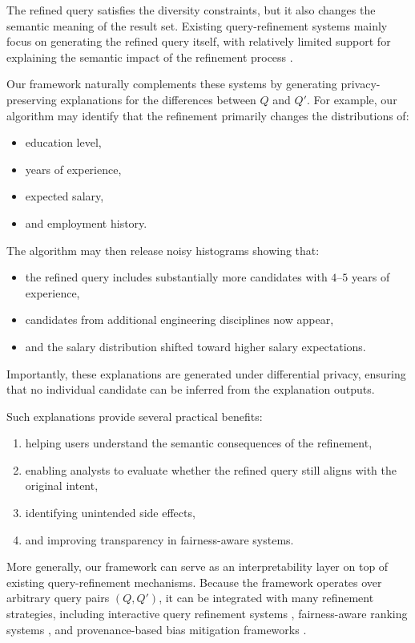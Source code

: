 The refined query satisfies the diversity constraints,
but it also changes the semantic meaning of the result set.
Existing query-refinement systems mainly focus on generating the refined query itself,
with relatively limited support for explaining the semantic impact
of the refinement process \cite{MK09,ERICA}.

Our framework naturally complements these systems by generating
privacy-preserving explanations for the differences between $Q$
and $Q'$.
For example, our algorithm may identify that the refinement
primarily changes the distributions of:
\begin{itemize}
    \item education level,
    \item years of experience,
    \item expected salary,
    \item and employment history.
\end{itemize}

The algorithm may then release noisy histograms showing that:
\begin{itemize}
    \item the refined query includes substantially more candidates
    with $4$--$5$ years of experience,
    \item candidates from additional engineering disciplines now appear,
    \item and the salary distribution shifted toward higher salary expectations.
\end{itemize}

Importantly, these explanations are generated under differential privacy,
ensuring that no individual candidate can be inferred from the explanation outputs.

Such explanations provide several practical benefits:
\begin{enumerate}
    \item helping users understand the semantic consequences of the refinement,
    \item enabling analysts to evaluate whether the refined query still aligns
    with the original intent,
    \item identifying unintended side effects,
    \item and improving transparency in fairness-aware systems.
\end{enumerate}

More generally, our framework can serve as an interpretability layer
on top of existing query-refinement mechanisms.
Because the framework operates over arbitrary query pairs $(Q,Q')$,
it can be integrated with many refinement strategies,
including interactive query refinement systems \cite{MK09},
fairness-aware ranking systems \cite{SYJ18},
and provenance-based bias mitigation frameworks \cite{MLJ22}.

